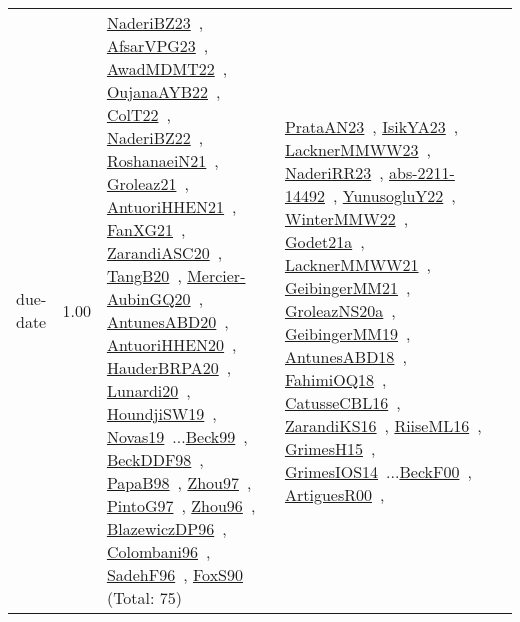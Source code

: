 {\begin{longtable}{p{3cm}r>{\raggedright\arraybackslash}p{6cm}>{\raggedright\arraybackslash}p{6cm}>{\raggedright\arraybackslash}p{8cm}}
\index{due-date}\index{Concepts!due-date}due-date &  1.00 & \href{../works/NaderiBZ23.pdf}{NaderiBZ23}~\cite{NaderiBZ23}, \href{../works/AfsarVPG23.pdf}{AfsarVPG23}~\cite{AfsarVPG23}, \href{../works/AwadMDMT22.pdf}{AwadMDMT22}~\cite{AwadMDMT22}, \href{../works/OujanaAYB22.pdf}{OujanaAYB22}~\cite{OujanaAYB22}, \href{../works/ColT22.pdf}{ColT22}~\cite{ColT22}, \href{../works/NaderiBZ22.pdf}{NaderiBZ22}~\cite{NaderiBZ22}, \href{../works/RoshanaeiN21.pdf}{RoshanaeiN21}~\cite{RoshanaeiN21}, \href{../works/Groleaz21.pdf}{Groleaz21}~\cite{Groleaz21}, \href{../works/AntuoriHHEN21.pdf}{AntuoriHHEN21}~\cite{AntuoriHHEN21}, \href{../works/FanXG21.pdf}{FanXG21}~\cite{FanXG21}, \href{../works/ZarandiASC20.pdf}{ZarandiASC20}~\cite{ZarandiASC20}, \href{../works/TangB20.pdf}{TangB20}~\cite{TangB20}, \href{../works/Mercier-AubinGQ20.pdf}{Mercier-AubinGQ20}~\cite{Mercier-AubinGQ20}, \href{../works/AntunesABD20.pdf}{AntunesABD20}~\cite{AntunesABD20}, \href{../works/AntuoriHHEN20.pdf}{AntuoriHHEN20}~\cite{AntuoriHHEN20}, \href{../works/HauderBRPA20.pdf}{HauderBRPA20}~\cite{HauderBRPA20}, \href{../works/Lunardi20.pdf}{Lunardi20}~\cite{Lunardi20}, \href{../works/HoundjiSW19.pdf}{HoundjiSW19}~\cite{HoundjiSW19}, \href{../works/Novas19.pdf}{Novas19}~\cite{Novas19}...\href{../works/Beck99.pdf}{Beck99}~\cite{Beck99}, \href{../works/BeckDDF98.pdf}{BeckDDF98}~\cite{BeckDDF98}, \href{../works/PapaB98.pdf}{PapaB98}~\cite{PapaB98}, \href{../works/Zhou97.pdf}{Zhou97}~\cite{Zhou97}, \href{../works/PintoG97.pdf}{PintoG97}~\cite{PintoG97}, \href{../works/Zhou96.pdf}{Zhou96}~\cite{Zhou96}, \href{../works/BlazewiczDP96.pdf}{BlazewiczDP96}~\cite{BlazewiczDP96}, \href{../works/Colombani96.pdf}{Colombani96}~\cite{Colombani96}, \href{../works/SadehF96.pdf}{SadehF96}~\cite{SadehF96}, \href{../works/FoxS90.pdf}{FoxS90}~\cite{FoxS90} (Total: 75) & \href{../works/PrataAN23.pdf}{PrataAN23}~\cite{PrataAN23}, \href{../works/IsikYA23.pdf}{IsikYA23}~\cite{IsikYA23}, \href{../works/LacknerMMWW23.pdf}{LacknerMMWW23}~\cite{LacknerMMWW23}, \href{../works/NaderiRR23.pdf}{NaderiRR23}~\cite{NaderiRR23}, \href{../works/abs-2211-14492.pdf}{abs-2211-14492}~\cite{abs-2211-14492}, \href{../works/YunusogluY22.pdf}{YunusogluY22}~\cite{YunusogluY22}, \href{../works/WinterMMW22.pdf}{WinterMMW22}~\cite{WinterMMW22}, \href{../works/Godet21a.pdf}{Godet21a}~\cite{Godet21a}, \href{../works/LacknerMMWW21.pdf}{LacknerMMWW21}~\cite{LacknerMMWW21}, \href{../works/GeibingerMM21.pdf}{GeibingerMM21}~\cite{GeibingerMM21}, \href{../works/GroleazNS20a.pdf}{GroleazNS20a}~\cite{GroleazNS20a}, \href{../works/GeibingerMM19.pdf}{GeibingerMM19}~\cite{GeibingerMM19}, \href{../works/AntunesABD18.pdf}{AntunesABD18}~\cite{AntunesABD18}, \href{../works/FahimiOQ18.pdf}{FahimiOQ18}~\cite{FahimiOQ18}, \href{../works/CatusseCBL16.pdf}{CatusseCBL16}~\cite{CatusseCBL16}, \href{../works/ZarandiKS16.pdf}{ZarandiKS16}~\cite{ZarandiKS16}, \href{../works/RiiseML16.pdf}{RiiseML16}~\cite{RiiseML16}, \href{../works/GrimesH15.pdf}{GrimesH15}~\cite{GrimesH15}, \href{../works/GrimesIOS14.pdf}{GrimesIOS14}~\cite{GrimesIOS14}...\href{../works/BeckF00.pdf}{BeckF00}~\cite{BeckF00}, \href{../works/ArtiguesR00.pdf}{ArtiguesR00}~\cite{ArtiguesR00}, 
\end{longtable}}
